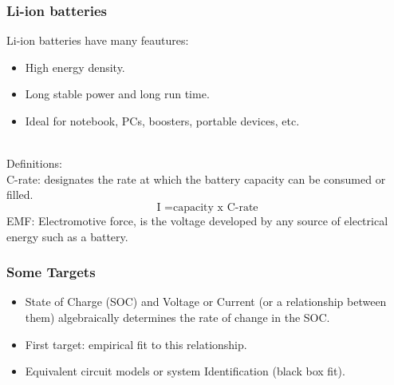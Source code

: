\documentclass{beamer}
\begin{document}
\begin{frame}
  \frametitle{Li-ion batteries}
Li-ion batteries have many feautures:
\begin{itemize}
\item High energy density.
\item Long stable power and long run time.
\item Ideal for notebook, PCs, boosters, portable devices, etc.
\end{itemize}\\

 Definitions:\\
 C-rate: designates the rate at which the battery capacity can be  consumed or filled.
 \[ \textrm{I =capacity x C-rate}\]
 EMF: Electromotive force, is the voltage developed by any source of electrical energy such as a battery.\\

\end{frame}

\begin{frame}
 \frametitle{Some Targets}
 \begin{itemize}
 \item State of Charge (SOC) and Voltage or Current (or a relationship between them) algebraically determines the rate
   of change in the SOC.
   \item First target: empirical fit to this relationship. %
\item Equivalent circuit models or system Identification (black box
  fit).
 \end{itemize}
 
\end{frame}



\end{document}
